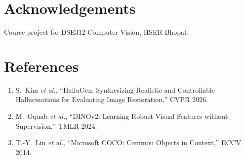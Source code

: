 \documentclass{article}
\begin{document}
\section*{Acknowledgements}
Course project for DSE312 Computer Vision, IISER Bhopal.

\section*{References}

\begin{enumerate}
\item S.~Kim \textit{et al.}, ``HalluGen: Synthesizing Realistic and Controllable Hallucinations for Evaluating Image Restoration,'' CVPR 2026.
\item M.~Oquab \textit{et al.}, ``DINOv2: Learning Robust Visual Features without Supervision,'' TMLR 2024.
\item T.-Y.~Lin \textit{et al.}, ``Microsoft COCO: Common Objects in Context,'' ECCV 2014.
\end{enumerate}
\end{document}
